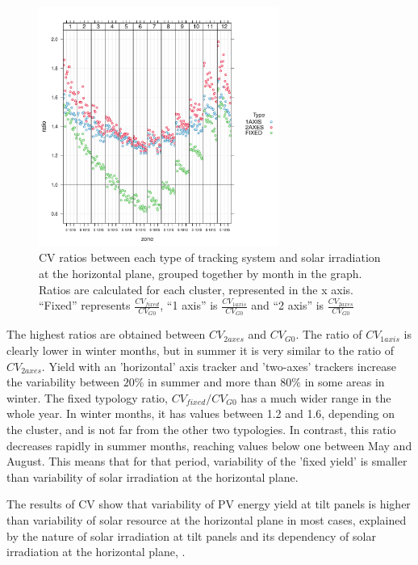 \begin{figure}
  \includegraphics[width=0.7\textwidth]{figs/capitulo5/dotplot_ratio_zone.pdf}
  \caption{CV ratios between each type of tracking system and solar irradiation at the horizontal plane, grouped together by month in the graph. Ratios are calculated for each cluster, represented in the x axis. ``Fixed'' represents $\frac{CV_{fixed}}{CV_{G0}}$, ``1 axis'' is $\frac{CV_{1axis}}{CV_{G0}}$ and ``2 axis'' is $\frac{CV_{2axes}}{CV_{G0}}$}
  \label{ratiosCV}
\end{figure}

The highest ratios are obtained between $CV_{2axes}$ and $CV_{G0}$. The ratio of $CV_{1axis}$ is clearly lower in winter months, but in summer it is very similar to the ratio of $CV_{2axes}$. Yield with an 'horizontal' axis tracker and 'two-axes' trackers increase the variability between $20\%$ in summer and more than $80\%$ in some areas in winter. The fixed typology ratio, $CV_{fixed}/CV_{G0}$ has a much wider range in the whole year. In winter months, it has values between 1.2 and 1.6, depending on the cluster, and is not far from the other two typologies. In contrast, this ratio decreases rapidly in summer months, reaching values below one between May and August. This means that for that period, variability of the 'fixed yield' is smaller than variability of solar irradiation at the horizontal plane.

The results of CV show that variability of PV energy yield at tilt panels is higher than variability of solar resource at the horizontal plane in most cases, explained by the nature of solar irradiation at tilt panels and its dependency of solar irradiation at the horizontal plane, \cite{Perpinan2009}.


